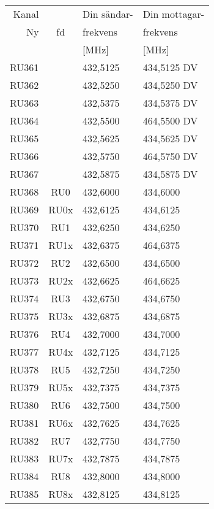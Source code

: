 \begin{tabular}{ r | c | l | l }
	Kanal &       & Din sändar-        & Din mottagar-  \\
	Ny    & fd    & frekvens       & frekvens \\
          &       & [\si{\mega\hertz}] & [\si{\mega\hertz}] \\
	\hline
	RU361 &       & 432,5125       & 434,5125 DV    \\
	RU362 &       & 432,5250       & 434,5250 DV    \\
	RU363 &       & 432,5375       & 434,5375 DV    \\
	RU364 &       & 432,5500       & 464,5500 DV    \\
	RU365 &       & 432,5625       & 434,5625 DV    \\
	RU366 &       & 432,5750       & 464,5750 DV    \\
	RU367 &       & 432,5875       & 434,5875 DV    \\
	RU368 & RU0   & 432,6000       & 434,6000       \\
	RU369 & RU0x  & 432,6125       & 434,6125       \\
	RU370 & RU1   & 432,6250       & 434,6250       \\
	RU371 & RU1x  & 432,6375       & 464,6375       \\
	RU372 & RU2   & 432,6500       & 434,6500       \\
	RU373 & RU2x  & 432,6625       & 464,6625       \\
	RU374 & RU3   & 432,6750       & 434,6750       \\
	RU375 & RU3x  & 432,6875       & 434,6875       \\
	RU376 & RU4   & 432,7000       & 434,7000       \\
	RU377 & RU4x  & 432,7125       & 434,7125       \\
	RU378 & RU5   & 432,7250       & 434,7250       \\
	RU379 & RU5x  & 432,7375       & 434,7375       \\
	RU380 & RU6   & 432,7500       & 434,7500       \\
	RU381 & RU6x  & 432,7625       & 434,7625       \\
	RU382 & RU7   & 432,7750       & 434,7750       \\
	RU383 & RU7x  & 432,7875       & 434,7875       \\
	RU384 & RU8   & 432,8000       & 434,8000       \\
	RU385 & RU8x  & 432,8125       & 434,8125       \\

\end{tabular}
